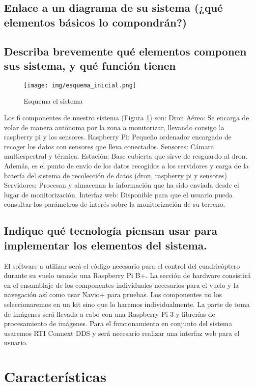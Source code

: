 \documentclass[11pt,spanish]{article} %
\begin{document}
\subsection{Enlace a un diagrama de su sistema (¿qué elementos básicos lo compondrán?)} 

\subsection{Describa brevemente qué elementos componen sus sistema, y qué función tienen}

\begin{figure}
	\centering
	\texttt{[image: img/esquema\_inicial.png]}
	\caption{Esquema el sistema}
	\label{fig:esquema_inicial}
\end{figure}

Los 6 componentes de nuestro sistema (Figura \ref{fig:esquema_inicial}) son:
Dron Aéreo: Se encarga de volar de manera autónoma por la zona a monitorizar, llevando consigo la raspberry pi y los sensores.
Raspberry Pi: Pequeño ordenador encargado de recoger los datos con sensores que lleva conectados.
Sensores: Cámara multiespectral y térmica. 
Estación: Base cubierta que sirve de resguardo al dron. Además, es el punto de envío de los datos recogidos a los servidores y carga de la batería del sistema de recolección de datos (dron, raspberry pi  y sensores)
Servidores: Procesan y almacenan la información que ha sido enviada desde el lugar de monitorización.
Interfaz web: Disponible para que el usuario pueda consultar los parámetros de interés sobre la monitorización de su terreno.


\subsection{Indique qué tecnología piensan usar para implementar los elementos del sistema.}
El software a utilizar será el código necesario para el control del cuadricóptero durante su vuelo usando una Raspberry Pi B+. La sección de hardware consistirá en el ensamblaje de los componentes individuales necesarios para el vuelo y la navegación así como usar Navio+ para pruebas. Los componentes no los seleccionaremos en un kit sino que lo haremos individualmente. La parte de toma de imágenes será llevada a cabo con una Raspberry Pi 3 y librerías de procesamiento de imágenes. Para el funcionamiento en conjunto del sistema usaremos RTI Connext DDS y será necesario realizar una interfaz web para el usuario.


\section{Características}


\end{document}
